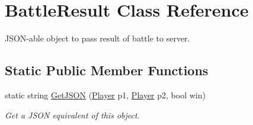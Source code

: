 \hypertarget{class_battle_result}{}\section{Battle\+Result Class Reference}
\label{class_battle_result}


J\+S\+O\+N-\/able object to pass result of battle to server.  


\subsection*{Static Public Member Functions}
\begin{DoxyCompactItemize}
\item 
\mbox{\label{class_battle_result_a269702cb7e87a7029e0ff374eefd5547}} 
static string \mbox{\hyperlink{class_battle_result_a269702cb7e87a7029e0ff374eefd5547}{Get\+J\+S\+ON}} (\mbox{\hyperlink{class_player}{Player}} p1, \mbox{\hyperlink{class_player}{Player}} p2, bool win)
\begin{DoxyCompactList}\small\item\em Get a J\+S\+ON equivalent of this object. \end{DoxyCompactList}\end{DoxyCompactItemize}
